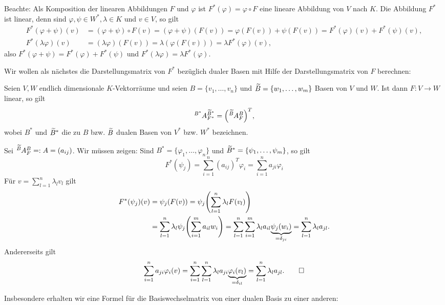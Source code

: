 Beachte: Als Komposition der linearen Abbildungen $F$ und $\varphi$  ist $F^*(\varphi) = \varphi \circ F$ eine lineare Abbildung von $V$ nach $K$.
Die Abbildung $F^*$ ist linear, denn sind $\varphi, \psi \in W^*, \lambda \in K$ und $v \in V$, so gilt
\begin{align*}
	F^*(\varphi + \psi)(v) &= (\varphi + \psi) \circ F(v) = (\varphi + \psi)(F(v)) = \varphi(F(v)) + \psi(F(v)) = F^*(\varphi)(v) + F^*(\psi)(v), \\
	F^*(\lambda \varphi)(v) &= (\lambda \varphi)(F(v)) = \lambda(\varphi(F(v))) = \lambda F^*(\varphi)(v),
\end{align*}
also $F^*(\varphi + \psi) = F^*(\varphi) + F^*(\psi)$ und $F^*(\lambda \varphi) = \lambda F^*(\varphi)$.

Wir wollen als nächstes die Darstellungsmatrix von $F^*$ bezüglich dualer Basen mit Hilfe der Darstellungsmatrix von $F$ berechnen:

\begin{satz}
	\label{satz:12.8}
	Seien $V,W$ endlich dimensionale $K$-Vektorräume und seien $B = \{v_1,\dots,v_n\}$ und $\widetilde{B} = \{w_1,\dots,w_m\}$ Basen von $V$ und $W$.
	Ist dann $F \colon V \rightarrow W$ linear, so gilt
	\[
		\mat{A}{B^*}{\wt{B}^*}{F^*} = \enb{\mat{A}{\wt{B}}{B}{F}}^T,
	\]
	wobei $B^*$ und $\widetilde{B}^*$ die zu $B$ bzw. $\widetilde{B}$ dualen Basen von $V^*$ bzw. $W^*$ bezeichnen.
\end{satz}

\begin{beweis}
	Sei $\mat{A}{\wt{B}}{B}{F} =: A = (a_{ij})$.
	Wir müssen zeigen:
	Sind $B^* = \{\varphi_1,\dots,\varphi_n\}$ und $\widetilde{B}^* = \{\psi_1,\dots,\psi_m\}$, so gilt
	\[
		F^*(\psi_j) = \sum_{i=1}^{n} (a_{ij})^T \varphi_i = \sum_{i=1}^{n} a_{ji} \varphi_i
	\]
	Für $v = \sum_{l=1}^{n} \lambda_l v_l$ gilt
	\begin{align*}
		F^*(\psi_j)(v) &= \psi_j (F(v)) = \psi_j\enb{\sum_{l=1}^{n} \lambda_l F(v_l)} \\
		&= \sum_{l=1}^{n} \lambda_l \psi_j \enb{ \sum_{i=1}^{m} a_{il} w_i} = \sum_{l=1}^{n} \sum_{i=1}^{m} \lambda_l a_{il} \Underbrace{\psi_j(w_i)}{=\delta_{ji}} = \sum_{l=1}^{n} \lambda_l a_{jl}.
	\end{align*}
	Andererseits gilt
	\[
		\sum_{i=1}^{n} a_{ji} \varphi_i(v) = \sum_{i=1}^{n} \sum_{l=1}^{n} \lambda_l a_{ji} {\underbrace{\varphi_i(v_l)}_{=\delta_{il}}} = \sum_{l=1}^{n} \lambda_l a_{jl}. \qedhere
	\]
\end{beweis}

Insbesondere erhalten wir eine Formel für die Basiswechselmatrix von einer dualen Basis zu einer anderen:

